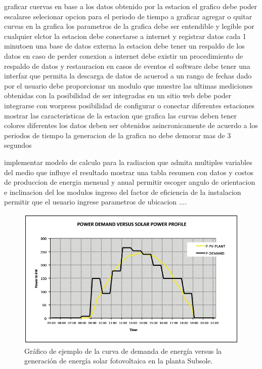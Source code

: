 graficar cuervas en base a los datos obtenido por la estacion
el grafico debe poder escalarse
selecionar opcion para el periodo de tiempo a graficar
agregar o quitar curvas en la grafica
los parametros de la grafica debe ser entendible y legible por cualquier elctor
la estacion debe conectarse a internet y registrar datos cada 1 minutoen una base de datos externa
la estacion debe tener un respaldo de los datos en caso de perder conexion a internet
debe existir un procedimiento de respaldo de datos y restauracion en casos de eventos
el software debe tener una interfaz que permita la descarga de datos de acuerod a un rango de fechas dado por el usuario
debe proporcionar un modulo que muestre las ultimas mediciones obtenidas con la posibilidad de ser integradas en un sitio web
debe poder integrarse con worpress
posibilidad de configurar o conectar diferentes estaciones
mostrar las caracteristicas de la estacion que grafica
las curvas deben tener colores diferentes
los datos deben ser obtenidos asincronicamente de acuerdo a los periodos de tiempo
la generacion de la grafica no debe demorar mas de 3 segundos


implementar modelo de calculo para la radiacion que admita multiples variables del medio que influye el resultado
mostrar una tabla resumen con datos y costos de produccion de energia mensual y anual
permitir escoger angulo de orientacion e inclinacion del los modulos
ingreso del factor de eficiencia de la instalacion
permitir que el usuario ingrese parametros de ubicacion ....  

\begin{figure}[h!]
        \centering
        \includegraphics[scale=0.5]{images/demandaGeneracionSubSole}
        \caption{\tiny Gráfico de ejemplo de la curva de demanda de energía versus la generación de energía solar fotovoltaica en la planta Subsole.}
\end{figure}

